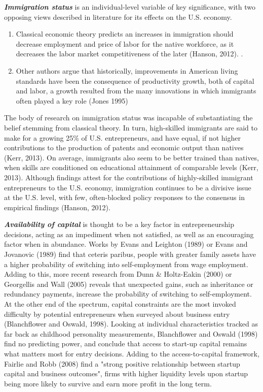 \textbf{\textit{Immigration status}} is an individual-level variable of key significance, with two opposing views described in literature for its effects on the U.S. economy.
\renewcommand{\labelenumi}{\roman{enumi}}
\begin{enumerate}
   \item Classical economic theory predicts an increases in immigration should decrease employment and price of labor for the native workforce, as it decreases the labor market competitiveness of the later  (Hanson, 2012). . 
   \item Other authors argue that historically, improvements in American living standards have been the consequence of productivity growth, both of capital and labor, a growth resulted from the many innovations in which immigrants often played a key role (Jones 1995)
\end{enumerate}
The body of research on immigration status was incapable of substantiating the belief stemming from classical theory. In turn, high-skilled immigrants are said to make for a growing 25\% of U.S. entrepreneurs, and have equal, if not higher contributions to the production of patents and economic output than natives (Kerr, 2013). On average, immigrants also seem to be better trained than natives, when skills are conditioned on educational attainment of comparable levels (Kerr, 2013). Although findings attest for the contributions of highly-skilled immigrant entrepreneurs to the U.S. economy, immigration continues to be a divisive issue at the U.S. level, with few, often-blocked policy  responses to the consensus in empirical findings (Hanson, 2012). 

\textbf{\textit{Availability of capital}} is thought to be a key factor in entrepreneurship decisions, acting as an impediment when not satisfied, as well as an encouraging factor when in abundance. Works by Evans and Leighton (1989) or Evans and Jovanovic (1989) find that ceteris paribus, people with greater family assets have a higher probability of switching into self-employment from wage employment. Adding to this, more recent research from Dunn & Holtz-Eakin (2000) or Georgellis and Wall (2005) reveals that unexpected gains, such as inheritance or redundancy payments, increase the probability of switching to self-employment. At the other end of the spectrum, capital constraints are the most invoked difficulty by potential entrepreneurs when surveyed about business entry (Blanchflower and Oswald, 1998). Looking at individual characteristics tracked as far back as childhood personality measurements, Blanchflower and Oswald (1998) find no predicting power, and conclude that access to start-up capital remains what matters most for entry decisions. Adding to the access-to-capital framework, Fairlie and Robb (2008) find a "strong positive relationship between startup capital and business outcomes", firms with higher liquidity levels upon startup being more likely to survive and earn more profit in the long term.

